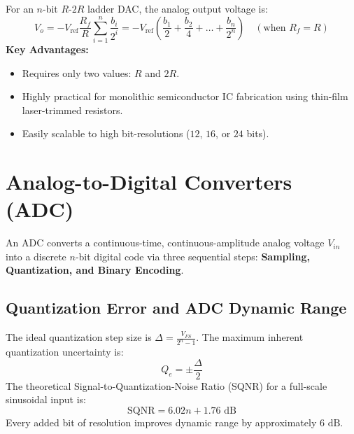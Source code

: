 \documentclass[12pt,a4paper]{article}
\begin{document}
For an $n$-bit $R\text{-}2R$ ladder DAC, the analog output voltage is:
\begin{equation}
  V_o = -V_{\text{ref}} \frac{R_f}{R} \sum_{i=1}^{n} \frac{b_i}{2^i} = -V_{\text{ref}} \left( \frac{b_1}{2} + \frac{b_2}{4} + \dots + \frac{b_n}{2^n} \right) \quad (\text{when } R_f = R)
\end{equation}
\textbf{Key Advantages:}
\begin{itemize}[leftmargin=*, itemsep=2pt]
  \item Requires only two values: $R$ and $2R$.
  \item Highly practical for monolithic semiconductor IC fabrication using thin-film laser-trimmed resistors.
  \item Easily scalable to high bit-resolutions ($12$, $16$, or $24$ bits).
\end{itemize}

\section{Analog-to-Digital Converters (ADC)}

An ADC converts a continuous-time, continuous-amplitude analog voltage $V_{in}$ into a discrete $n$-bit digital code via three sequential steps: \textbf{Sampling, Quantization, and Binary Encoding}.

\subsection{Quantization Error and ADC Dynamic Range}
The ideal quantization step size is $\Delta = \frac{V_{FS}}{2^n - 1}$. The maximum inherent quantization uncertainty is:
\begin{equation}
  Q_e = \pm \frac{\Delta}{2}
\end{equation}
The theoretical Signal-to-Quantization-Noise Ratio (SQNR) for a full-scale sinusoidal input is:
\begin{equation}
  \text{SQNR} = 6.02 n + 1.76 \text{ dB}
\end{equation}
Every added bit of resolution improves dynamic range by approximately $6\text{ dB}$.
\end{document}
